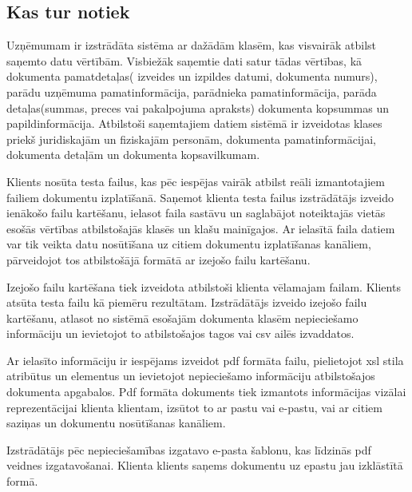 \subsection{Kas tur notiek}
\par Uzņēmumam ir izstrādāta sistēma ar dažādām klasēm, kas visvairāk atbilst saņemto datu vērtībām. Visbiežāk saņemtie dati satur tādas vērtības, kā dokumenta pamatdetaļas( izveides un izpildes datumi, dokumenta numurs), parādu uzņēmuma pamatinformācija, parādnieka pamatinformācija, parāda detaļas(summas, preces vai pakalpojuma apraksts) dokumenta kopsummas un papildinformācija. Atbilstoši saņemtajiem datiem sistēmā ir izveidotas klases priekš juridiskajām un fiziskajām personām, dokumenta pamatinformācijai, dokumenta detaļām un dokumenta kopsavilkumam.
\par Klients nosūta testa failus, kas pēc iespējas vairāk atbilst reāli izmantotajiem failiem dokumentu izplatīšanā. Saņemot klienta testa failus izstrādātājs izveido ienākošo failu kartēšanu, ielasot faila sastāvu un saglabājot noteiktajās vietās esošās vērtības atbilstošajās klasēs un klašu mainīgajos. Ar ielasītā faila datiem var tik veikta datu nosūtīšana uz citiem dokumentu izplatīšanas kanāliem, pārveidojot tos atbilstošājā formātā ar izejošo failu kartēšanu.
\par Izejošo failu kartēšana tiek izveidota atbilstoši klienta vēlamajam failam. Klients atsūta testa failu kā piemēru rezultātam. Izstrādātājs izveido izejošo failu kartēšanu, atlasot no sistēmā esošajām dokumenta klasēm nepieciešamo informāciju un ievietojot to atbilstošajos tagos vai csv ailēs izvaddatos.
\par Ar ielasīto informāciju ir iespējams izveidot pdf formāta failu, pielietojot xsl stila atribūtus un elementus un ievietojot nepieciešamo informāciju atbilstošajos dokumenta apgabalos. Pdf formāta dokuments tiek izmantots informācijas vizālai reprezentācijai klienta klientam, izsūtot to ar pastu vai e-pastu, vai ar citiem saziņas un dokumentu nosūtīšanas kanāliem.
\par Izstrādātājs pēc nepieciešamības izgatavo e-pasta šablonu, kas līdzinās pdf veidnes izgatavošanai. Klienta klients saņems dokumentu uz epastu jau izklāstītā formā.



